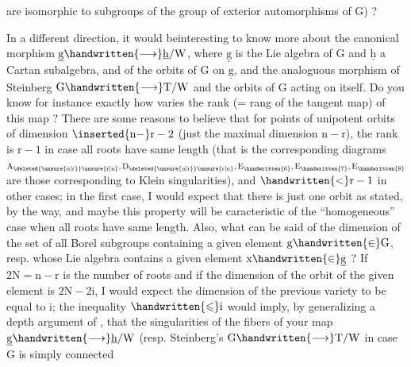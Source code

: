
are isomorphic to subgroups of the group of exterior automorphisms of $\mathrm{G}$) ?

In a different direction, it would be\handwritten{\raisebox{.6ex}{$\vert$}}interesting to know more about the canonical morphism $\underline{\mathrm{g}}\handwritten{\longrightarrow}\underline{\mathrm{h}}/\mathrm{W}$, where $\underline{\mathrm{g}}$ is the Lie algebra of $\mathrm{G}$ and $\underline{\mathrm{h}}$ a Cartan subalgebra, and of the orbits of $\mathrm{G}$ on $\underline{\mathrm{g}}$, and the analoguous morphism of Steinberg $\mathrm{G}\handwritten{\longrightarrow}\mathrm{T}/\mathrm{W}$ and the orbits of $\mathrm{G}$ acting on itself. Do you know for instance exactly how varies the rank (= rang of the tangent map) of this  map ? There are some reasons to believe that  for points of unipotent orbits of dimension $\inserted{\mathrm{n}-}\mathrm{r}-2$ (just  the maximal dimension $\mathrm{n}-\mathrm{r}$), the rank is $\mathrm{r}-1$ in case all roots have same length (that is the corresponding diagrams $\mathrm{A}_{\deleted{\unsure{\mathrm{n}|\mathrm{r}}}\unsure{\mathrm{r}|\mathrm{n}}},\mathrm{D}_{\deleted{\unsure{\mathrm{n}|\mathrm{r}}}\unsure{\mathrm{r}|\mathrm{n}}},\mathrm{E}_{\handwritten{6}},\mathrm{E}_{\handwritten{7}},\mathrm{E}_{\handwritten{8}}$ are those corresponding to Klein singularities), and $\handwritten{<}\mathrm{r}-1$ in  other cases; in the first case, I would expect that there is just one orbit as stated, by the way, and maybe this property will be caracteristic of the ``homogeneous'' case when all roots have same length. Also, what can be said of the dimension of the set of all Borel subgroups containing a given element $\mathrm{g}\handwritten{\in}\mathrm{G}$, resp. whose Lie algebra contains a given element $\mathrm{x}\handwritten{\in}\underline{\mathrm{g}}$ ? If $2\mathrm{N}=\mathrm{n}-\mathrm{r}$ is the number of roots and if the dimension of the orbit of the given element is $2\mathrm{N}-2\mathrm{i}$, I would expect the dimension of the previous variety to be equal to $\mathrm{i}$; the inequality $\handwritten{\leqslant}\mathrm{i}$ would imply, by generalizing a depth argument of , that the singularities of the fibers of your map $\underline{\mathrm{g}}\handwritten{\longrightarrow}\underline{\mathrm{h}}/\mathrm{W}$ (resp. Steinberg's $\mathrm{G}\handwritten{\longrightarrow}\mathrm{T}/\mathrm{W}$ in case $\mathrm{G}$ is simply connected 